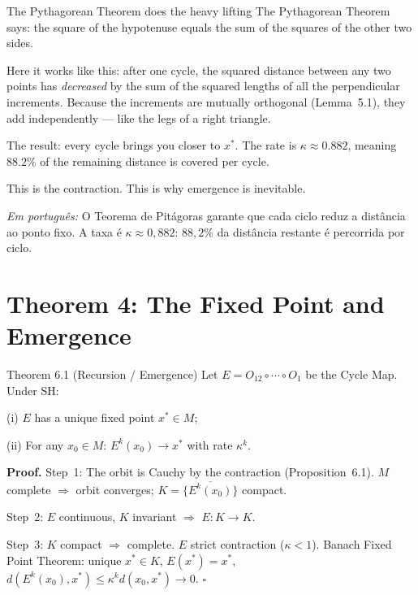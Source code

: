 \documentclass[12pt, openright]{book}
\theoremstyle{definition}
\theoremstyle{remark}
\begin{document}
\begin{studentbox}{The Pythagorean Theorem does the heavy lifting}
The Pythagorean Theorem says: the square of the hypotenuse
equals the sum of the squares of the other two sides.

Here it works like this: after one cycle, the squared distance
between any two points has \textit{decreased} by the sum of
the squared lengths of all the perpendicular increments.
Because the increments are mutually orthogonal (Lemma~5.1),
they add independently --- like the legs of a right triangle.

The result: every cycle brings you closer to $x^*$.
The rate is $\kappa \approx 0.882$, meaning $88.2\%$ of
the remaining distance is covered per cycle.

This is the contraction. This is why emergence is inevitable.

\textit{Em português:}
O Teorema de Pitágoras garante que cada ciclo reduz a distância
ao ponto fixo. A taxa é $\kappa \approx 0{,}882$: $88{,}2\%$
da distância restante é percorrida por ciclo.
\end{studentbox}

\section{Theorem 4: The Fixed Point and Emergence}

\begin{formalbox}{Theorem 6.1 (Recursion / Emergence)}
Let $E = O_{12} \circ \cdots \circ O_1$ be the Cycle Map. Under SH:

(i) $E$ has a unique fixed point $x^* \in M$;

(ii) For any $x_0 \in M$: $E^k(x_0) \to x^*$ with rate $\kappa^k$.

\textbf{Proof.}
Step~1: The orbit is Cauchy by the contraction (Proposition~6.1).
$M$ complete $\Rightarrow$ orbit converges; $K = \overline{\{E^k(x_0)\}}$ compact.

Step~2: $E$ continuous, $K$ invariant $\Rightarrow$ $E: K \to K$.

Step~3: $K$ compact $\Rightarrow$ complete. $E$ strict contraction ($\kappa < 1$).
Banach Fixed Point Theorem: unique $x^* \in K$, $E(x^*) = x^*$,
$d(E^k(x_0), x^*) \leq \kappa^k d(x_0, x^*) \to 0$. \hfill$\square$
\end{formalbox}
\end{document}

